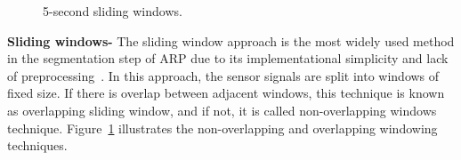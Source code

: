 \begin{figure}[htp]
  \centering
  \quad

   \caption{5-second sliding windows. }
   \label{fig:SlidingWindow}
\end{figure}

\noindent\textbf{Sliding windows-} The sliding window approach is the most widely used method in the segmentation step of ARP due to its implementational simplicity and lack of preprocessing~\citep{banos2014window}. In this approach, the sensor signals are split into windows of fixed size. If there is overlap between adjacent windows, this technique is known as overlapping sliding window, and if not, it is called non-overlapping windows technique. 
Figure~\ref{fig:SlidingWindow} illustrates the 
non-overlapping and overlapping windowing techniques.

